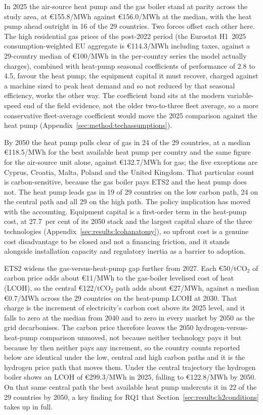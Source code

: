 In 2025 the air-source heat pump and the gas boiler stand at parity across the study
area, at \euro{}155.8/MWh against \euro{}156.0/MWh at the median, with the heat pump
ahead outright in 16 of the 29 countries. Two forces offset each other here. The high
residential gas prices of the post-2022 period (the Eurostat H1~2025
consumption-weighted EU aggregate is \euro{}114.3/MWh including taxes, against a
29-country median of \euro{}100/MWh in the per-country series the model actually
charges), combined with heat-pump seasonal coefficients of
performance of 2.8 to 4.5, favour the heat pump; the equipment capital it must recover,
charged against a machine sized to peak heat demand and so not reduced by that seasonal
efficiency, works the other way. The coefficient band sits at the modern variable-speed
end of the field evidence, not the older two-to-three fleet average, so a more
conservative fleet-average coefficient would move the 2025 comparison against the heat
pump (Appendix~\ref{sec:method:techassumptions}).

By 2050 the heat pump pulls clear of gas in 24 of the 29 countries, at a median
\euro{}118.5/MWh for the best available heat pump per country and the same figure for
the air-source unit alone, against \euro{}132.7/MWh for gas; the five exceptions are
Cyprus, Croatia, Malta, Poland and the United Kingdom. That particular count is
carbon-sensitive, because the gas boiler pays ETS2 and the heat pump does not. The heat
pump leads gas in 19 of 29 countries on the low carbon path, 24 on the central path and
all 29 on the high path. The policy implication has moved with the accounting. Equipment
capital is a first-order term in the heat-pump cost, at 27.7~per cent of its 2050 stack
and the largest capital share of the three technologies
(Appendix~\ref{sec:results:lcohanatomy}), so upfront cost is a genuine cost disadvantage
to be closed and not a financing friction, and it stands alongside
installation capacity and regulatory inertia as a barrier to adoption.

ETS2 widens the gas-versus-heat-pump gap further from 2027. Each \euro{}50/tCO$_2$ of
carbon price adds about \euro{}11/MWh to the gas-boiler levelised cost of heat (LCOH),
so the central \euro{}122/tCO$_2$ path adds about \euro{}27/MWh, against a median
\euro{}0.7/MWh across the 29 countries on the heat-pump LCOH at 2030. That charge is the increment of electricity's carbon cost above its 2025 level, and it
falls to zero at the median from 2040 and to zero in every market by 2050 as the grid
decarbonises. The carbon price therefore leaves
the 2050 hydrogen-versus-heat-pump comparison unmoved, not because neither technology
pays it but because by then neither pays any increment, so the country counts reported
below are identical under the low, central and high carbon paths and it is the hydrogen
price path that moves them. Under the central
trajectory the hydrogen boiler shows an LCOH of \euro{}299.3/MWh in 2025, falling
to \euro{}122.8/MWh by 2050. On that same central path the best available heat
pump undercuts it in 22 of the 29 countries by 2050, a key finding for RQ1 that
Section~\ref{sec:results:h2conditions} takes up in full.

